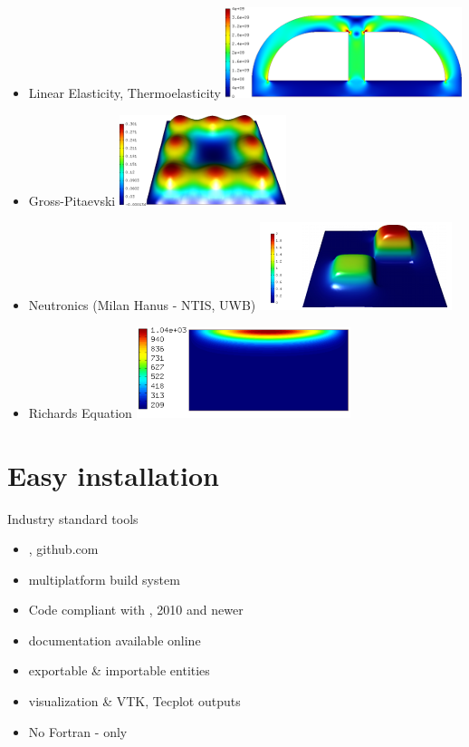 \documentclass{beamer}
\begin{document}
\begin{frame}
\begin{itemize}
		\item \small  Linear Elasticity, Thermoelasticity \hspace{12mm}  \includegraphics[height=.06\textheight]{outputs/mises.png} 
		\item \small  Gross-Pitaevski  \hspace{56mm} \includegraphics[height=.06\textheight]{outputs/sol_2.png} 
		\item \small  Neutronics (Milan Hanus - NTIS, UWB) \hspace{6mm}  \includegraphics[height=.06\textheight]{outputs/neutro_1.png} 
		\item \small  Richards Equation  \hspace{53mm} \includegraphics[height=.06\textheight]{outputs/rich.png}
	\end{itemize}
\end{frame}

\section{Easy installation}
\begin{frame}
Industry standard tools
\begin{itemize}
\item {}, github.com
\item {} multiplatform build system
\item Code compliant with ,  2010 and newer
\item {} documentation available online
\item {} exportable \& importable entities
\item {} visualization \& VTK, Tecplot outputs
\item No Fortran - only 
\end{itemize}
\end{frame}
\end{document}
